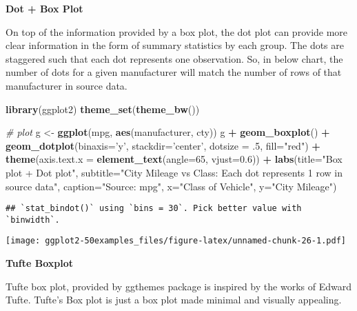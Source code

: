 \documentclass[a4paper]{article}
\newenvironment{Shaded}{\begin{snugshade}}{\end{snugshade}}
\newcommand{\KeywordTok}[1]{\textcolor[rgb]{0.13,0.29,0.53}{\textbf{#1}}}
\newcommand{\DataTypeTok}[1]{\textcolor[rgb]{0.13,0.29,0.53}{#1}}
\newcommand{\DecValTok}[1]{\textcolor[rgb]{0.00,0.00,0.81}{#1}}
\newcommand{\FloatTok}[1]{\textcolor[rgb]{0.00,0.00,0.81}{#1}}
\newcommand{\StringTok}[1]{\textcolor[rgb]{0.31,0.60,0.02}{#1}}
\newcommand{\CommentTok}[1]{\textcolor[rgb]{0.56,0.35,0.01}{\textit{#1}}}
\newcommand{\OperatorTok}[1]{\textcolor[rgb]{0.81,0.36,0.00}{\textbf{#1}}}
\newcommand{\NormalTok}[1]{#1}
\begin{document}
\textbf{Dot + Box Plot}

On top of the information provided by a box plot, the dot plot can
provide more clear information in the form of summary statistics by each
group. The dots are staggered such that each dot represents one
observation. So, in below chart, the number of dots for a given
manufacturer will match the number of rows of that manufacturer in
source data.

\begin{Shaded}
\begin{Highlighting}[]
\KeywordTok{library}\NormalTok{(ggplot2)}
\KeywordTok{theme_set}\NormalTok{(}\KeywordTok{theme_bw}\NormalTok{())}

\CommentTok{# plot}
\NormalTok{g <-}\StringTok{ }\KeywordTok{ggplot}\NormalTok{(mpg, }\KeywordTok{aes}\NormalTok{(manufacturer, cty))}
\NormalTok{g }\OperatorTok{+}\StringTok{ }\KeywordTok{geom_boxplot}\NormalTok{() }\OperatorTok{+}\StringTok{ }
\StringTok{  }\KeywordTok{geom_dotplot}\NormalTok{(}\DataTypeTok{binaxis=}\StringTok{'y'}\NormalTok{, }
               \DataTypeTok{stackdir=}\StringTok{'center'}\NormalTok{, }
               \DataTypeTok{dotsize =}\NormalTok{ .}\DecValTok{5}\NormalTok{, }
               \DataTypeTok{fill=}\StringTok{"red"}\NormalTok{) }\OperatorTok{+}
\StringTok{  }\KeywordTok{theme}\NormalTok{(}\DataTypeTok{axis.text.x =} \KeywordTok{element_text}\NormalTok{(}\DataTypeTok{angle=}\DecValTok{65}\NormalTok{, }\DataTypeTok{vjust=}\FloatTok{0.6}\NormalTok{)) }\OperatorTok{+}\StringTok{ }
\StringTok{  }\KeywordTok{labs}\NormalTok{(}\DataTypeTok{title=}\StringTok{"Box plot + Dot plot"}\NormalTok{, }
       \DataTypeTok{subtitle=}\StringTok{"City Mileage vs Class: Each dot represents 1 row in source data"}\NormalTok{,}
       \DataTypeTok{caption=}\StringTok{"Source: mpg"}\NormalTok{,}
       \DataTypeTok{x=}\StringTok{"Class of Vehicle"}\NormalTok{,}
       \DataTypeTok{y=}\StringTok{"City Mileage"}\NormalTok{)}
\end{Highlighting}
\end{Shaded}

\begin{verbatim}
## `stat_bindot()` using `bins = 30`. Pick better value with `binwidth`.
\end{verbatim}

\texttt{[image: ggplot2-50examples\_files/figure-latex/unnamed-chunk-26-1.pdf]}

\newpage

\textbf{Tufte Boxplot}

Tufte box plot, provided by ggthemes package is inspired by the works of
Edward Tufte. Tufte's Box plot is just a box plot made minimal and
visually appealing.
\end{document}
